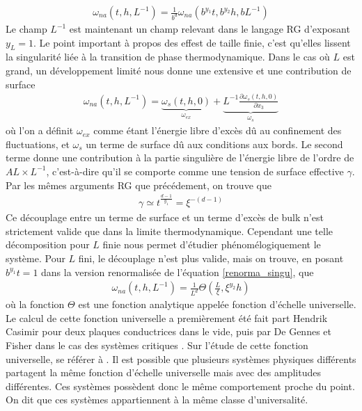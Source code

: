 \begin{align}
   \omega_{na}(t,h,L^{-1}) = \frac{1}{b^d}\omega_{na}(b^{y_1}t,b^{y_2}h,bL^{-1})
   \label{renorma_singu}
\end{align}
Le champ $L^{-1}$ est maintenant un champ relevant dans le langage RG d'exposant $y_L=1$. Le point important à propos  des effest de taille finie, c'est qu'elles lissent la singularité liée à la transition de phase thermodynamique. Dans le cas où $L$ est grand, un développement limité nous donne une extensive et une contribution de surface
\begin{align}
    \omega_{na}(t,h,L^{-1}) = \underbrace{\omega_s(t,h,0)}_{\omega_{ex}}  +\underbrace{L^{-1} \frac{\partial \omega_s(t,h,0)}{\partial x_3}}_{\omega_s}
    \label{decompostion-singu}
\end{align}
où l'on a définit $\omega_{ex}$ comme étant l'énergie libre d'excès dû au confinement des fluctuations, et $\omega_s$ un terme de surface dû aux conditions aux bords. Le second terme donne une contribution à la partie singulière de l'énergie libre de l'ordre de $AL \times L^{-1}$, c'est-à-dire qu'il se comporte comme une tension de surface effective $\gamma$. Par les mêmes arguments RG que précédement, on  trouve que 
\begin{align}
    \gamma \simeq t^{\frac{d-1}{y_1}} = \xi^{-(d-1)}
    \label{temp-xi}
\end{align}
Ce découplage entre un terme de surface et un terme d'excès de bulk n'est strictement valide que dans la limite thermodynamique. Cependant une telle décomposition pour $L$ finie nous permet d'étudier phénomélogiquement le système. Pour $L$ fini, le découplage n'est plus valide, mais on trouve, en posant $b^{y_1}t=1$ dans la version renormalisée de l'équation \ref{renorma_singu}, que
\begin{align}
    \omega_{na}(t,h,L^{-1}) = \frac{1}{L^d} \Theta(\frac{L}{\xi},\xi^{y_2}h)
    \label{theta-universel}
\end{align}
où la fonction $\Theta$ est une fonction analytique appelée fonction d'échelle universelle. Le calcul de cette fonction universelle a premièrement été fait part Hendrik Casimir \cite{h_b_g_casimir_attraction_1948} pour deux plaques conductrices dans le vide, puis par De Gennes et Fisher dans le cas des systèmes critiques \cite{gambassi_casimir_2009}. Sur l'étude de cette fonction universelle, se référer à \cite{gambassi_critical_2009,cardozo_finite_2015}.
Il est possible que plusieurs systèmes physiques différents partagent la même fonction d'échelle universelle mais avec des amplitudes différentes. Ces systèmes possèdent donc le même comportement proche du point. On dit que ces systèmes appartiennent à la même classe d'universalité.
